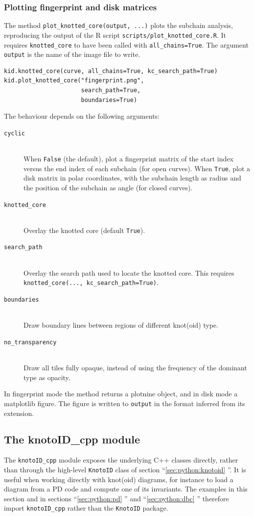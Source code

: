 \subsubsection{Plotting fingerprint and disk matrices}
The method \lstinline{plot_knotted_core(output, ...)} plots the subchain analysis, reproducing the output of the R script \lstinline{scripts/plot_knotted_core.R}. It requires \lstinline{knotted_core} to have been called with \lstinline{all_chains=True}. The argument \lstinline{output} is the name of the image file to write.
\begin{lstlisting}
kid.knotted_core(curve, all_chains=True, kc_search_path=True)
kid.plot_knotted_core("fingerprint.png",
                      search_path=True,
                      boundaries=True)
\end{lstlisting}
The behaviour depends on the following arguments:
\begin{description}
\item[\lstinline{cyclic}]\hfill\\
  When \lstinline{False} (the default), plot a fingerprint matrix\cite{yeates, sulkowska2012, gound} of the start index versus the end index of each subchain (for open curves). When \lstinline{True}, plot a disk matrix\cite{rawdon} in polar coordinates, with the subchain length as radius and the position of the subchain as angle (for closed curves).
\item[\lstinline{knotted_core}]\hfill\\
  Overlay the knotted core (default \lstinline{True}).
\item[\lstinline{search_path}]\hfill\\
  Overlay the search path used to locate the knotted core. This requires \lstinline{knotted_core(..., kc_search_path=True)}.
\item[\lstinline{boundaries}]\hfill\\
  Draw boundary lines between regions of different knot(oid) type.
\item[\lstinline{no_transparency}]\hfill\\
  Draw all tiles fully opaque, instead of using the frequency of the dominant type as opacity.
\end{description}
In fingerprint mode the method returns a {\ttfamily plotnine} object, and in disk mode a {\ttfamily matplotlib} figure. The figure is written to \lstinline{output} in the format inferred from its extension.

\subsection{\label{sec:python:cpp}The knotoID\_cpp module}
The \lstinline{knotoID_cpp} module exposes the underlying C++ classes directly, rather than through the high-level \lstinline{KnotoID} class of section ``\ref{sec:python:knotoid} ''. It is useful when working directly with knot(oid) diagrams, for instance to load a diagram from a PD code and compute one of its invariants. The examples in this section and in sections ``\ref{sec:python:pd} '' and ``\ref{sec:python:dbc} '' therefore import \lstinline{knotoID_cpp} rather than the \lstinline{KnotoID} package.

